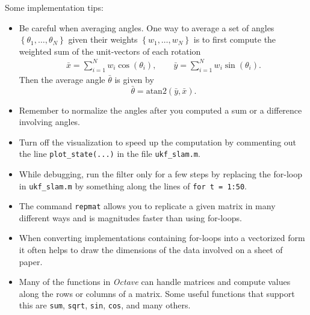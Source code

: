 \documentclass[12pt]{article}
\begin{document}
Some implementation tips:
\begin{itemize}
  \item
    Be careful when averaging angles. One way to average a set of angles
    $\left\{ \theta_1, \ldots, \theta_N \right\}$ given their weights
    $\left\{ w_1, \ldots, w_N \right\}$ is to first compute the weighted
    sum of the unit-vectors of each rotation
    \begin{eqnarray*}
      \bar x = \sum_{i=1}^N w_i \cos(\theta_i),\quad\quad
      \bar y = \sum_{i=1}^N w_i \sin(\theta_i).
    \end{eqnarray*}
    Then the average angle $\bar \theta$ is given by
    \begin{equation*}
      \bar \theta = \mathrm{atan2}(\bar y, \bar x).
    \end{equation*}
  \item Remember to normalize the angles after you computed a sum or a
    difference involving angles.
  \item Turn off the visualization to speed up the computation by
    commenting out the line \texttt{plot\_state(...)} in the file
    \texttt{ukf\_slam.m}.
  \item While debugging, run the filter only for a few steps by
    replacing the for-loop in \texttt{ukf\_slam.m} by something along
    the lines of \texttt{for t = 1:50}.
  \item The command \texttt{repmat} allows you to replicate a given
    matrix in many different ways and is magnitudes faster than using
    for-loops.
  \item When converting implementations containing for-loops into a
    vectorized form it often helps to draw the dimensions of the data
    involved on a sheet of paper.
  \item Many of the functions in \emph{Octave} can handle matrices and
    compute values along the rows or columns of a matrix. Some useful
    functions that support this are \texttt{sum}, \texttt{sqrt},
    \texttt{sin}, \texttt{cos}, and many others.
\end{itemize}
\end{document}
